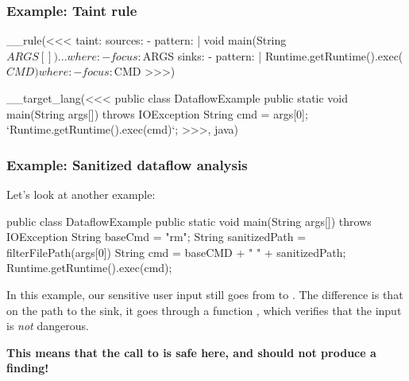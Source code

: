 \documentclass[aspectratio=169, handout]{beamer}
\begin{document}
\begin{frame}[fragile]
  \frametitle{Example: Taint rule}

{\footnotesize
\begin{center}
  \begin{minipage}{0.47\textwidth}

__rule(<<<
  taint:
    sources:
      - pattern: |
          void main(String $ARGS[]) {
            ...
          }
        where:
          - focus: $ARGS
    sinks:
      - pattern: |
          Runtime.getRuntime().exec($CMD)
        where:
          - focus: $CMD
>>>)

  \end{minipage}
  \hspace{10pt}
  \begin{minipage}{0.47\textwidth}

__target_lang(<<<
  public class DataflowExample {
    public static void main(String args[]) throws IOException {
      String cmd = args[0];
      `Runtime.getRuntime().exec(cmd)`;
    }
  }
>>>, java)
  \end{minipage}
\end{center}
}

  \pause
\end{frame}

\begin{frame}[fragile]
  \frametitle{Example: Sanitized dataflow analysis}

    Let's look at another example:

    \begin{pythoncodeblock}[language=java]
      public class DataflowExample {
        public static void main(String args[]) throws IOException {
          String baseCmd = "rm";
          String sanitizedPath = filterFilePath(args[0])
          String cmd = baseCMD + " " + sanitizedPath;
          Runtime.getRuntime().exec(cmd);
        }
      }
    \end{pythoncodeblock}

    \pause
    \vspace{\fill}

    In this example, our sensitive user input still goes from  to .
    The difference is that on the path to the sink, it goes through a function ,
    which verifies that the input is \textit{not} dangerous.

    \pause
    \vspace{\fill}

    \textbf{This means that the call to  is safe here, and should not produce a finding!}
\end{frame}
\end{document}
